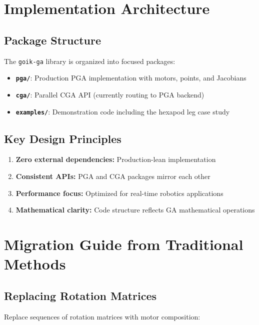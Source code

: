 \documentclass[11pt]{article}
\begin{document}
\section{Implementation Architecture}

\subsection{Package Structure}

The \texttt{goik-ga} library is organized into focused packages:

\begin{itemize}
    \item \textbf{\texttt{pga/}}: Production PGA implementation with motors, points, and Jacobians
    \item \textbf{\texttt{cga/}}: Parallel CGA API (currently routing to PGA backend)
    \item \textbf{\texttt{examples/}}: Demonstration code including the hexapod leg case study
\end{itemize}

\subsection{Key Design Principles}

\begin{enumerate}
    \item \textbf{Zero external dependencies:} Production-lean implementation
    \item \textbf{Consistent APIs:} PGA and CGA packages mirror each other
    \item \textbf{Performance focus:} Optimized for real-time robotics applications
    \item \textbf{Mathematical clarity:} Code structure reflects GA mathematical operations
\end{enumerate}

\section{Migration Guide from Traditional Methods}

\subsection{Replacing Rotation Matrices}

Replace sequences of rotation matrices with motor composition:
\end{document}
